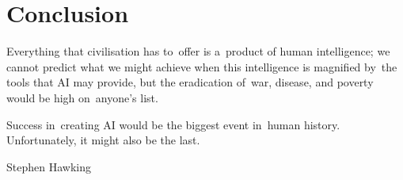 \chapter*{Conclusion}

\epigraph{
  Everything that civilisation has to~offer is a~product of human intelligence;
  we cannot predict what we might achieve when this intelligence is magnified by~the tools that AI may provide, but the eradication of~war, disease, and poverty would be high on~anyone's list.

  Success in~creating AI would be the biggest event in~human history.
  Unfortunately, it might also be the last.
}{Stephen Hawking}
